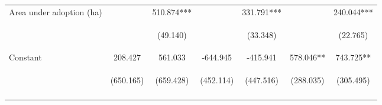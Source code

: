 \begin{center}
\begin{tabular}{lcccccc}
Area under adoption (ha) &  & 510.874*** &  & 331.791*** &  & 240.044*** \\
\vspace{4pt} & \begin{footnotesize}\end{footnotesize} & \begin{footnotesize}(49.140)\end{footnotesize} & \begin{footnotesize}\end{footnotesize} & \begin{footnotesize}(33.348)\end{footnotesize} & \begin{footnotesize}\end{footnotesize} & \begin{footnotesize}(22.765)\end{footnotesize} \\
Constant & 208.427 & 561.033 & -644.945 & -415.941 & 578.046** & 743.725** \\
 & \begin{footnotesize}(650.165)\end{footnotesize} & \begin{footnotesize}(659.428)\end{footnotesize} & \begin{footnotesize}(452.114)\end{footnotesize} & \begin{footnotesize}(447.516)\end{footnotesize} & \begin{footnotesize}(288.035)\end{footnotesize} & \begin{footnotesize}(305.495)\end{footnotesize} \\
\vspace{4pt} & \begin{footnotesize}\end{footnotesize} & \begin{footnotesize}\end{footnotesize} & \begin{footnotesize}\end{footnotesize} & \begin{footnotesize}\end{footnotesize} & \begin{footnotesize}\end{footnotesize} & \begin{footnotesize}\end{footnotesize} \\

\end{tabular}
\end{center}
